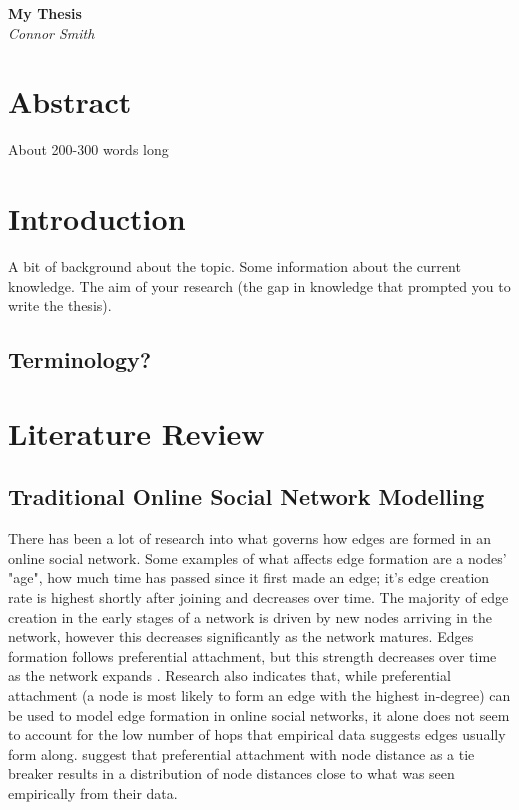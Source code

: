 \documentclass{article}
\begin{document}
\begin{titlepage}
   \begin{center}
      \Large\textbf{My Thesis}\\
      \large\textit{Connor Smith}
   \end{center}
\end{titlepage}
\section{Abstract}
About 200-300 words long\\

\section{Introduction}
A bit of background about the topic.
Some information about the current knowledge.
The aim of your research (the gap in knowledge that prompted you to write the thesis).
    \subsection{Terminology?}
        
\section{Literature Review}
    \subsection{Traditional Online Social Network Modelling}
        There has been a lot of research into what governs how edges are formed in an online social network. Some examples of what affects edge formation are a nodes' "age", how much time has passed since it first made an edge; it's edge creation rate is highest shortly after joining and decreases over time. The majority of edge creation in the early stages of a network is driven by new nodes arriving in the network, however this decreases significantly as the network matures. Edges formation follows preferential attachment, but this strength decreases over time as the network expands \cite{zhao2012multi}. Research also indicates that, while preferential attachment (a node is most likely to form an edge with the highest in-degree) can be used to model edge formation in online social networks, it alone does not seem to account for the low number of hops that empirical data suggests edges usually form along. \cite{garg2009evolution} suggest that preferential attachment with node distance as a tie breaker results in a distribution of node distances close to what was seen empirically from  their data.\\
        
\end{document}
